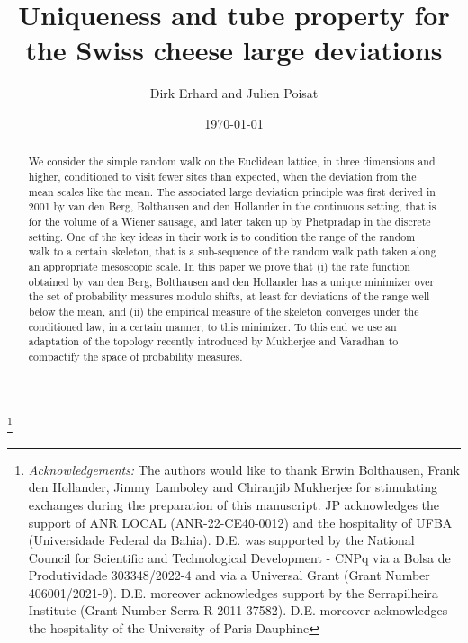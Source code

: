 \documentclass[a4paper,11pt]{amsart}
\numberwithin{equation}{section}
\newcommand{\8}{\infty}
\begin{document}
\title[]{Uniqueness and tube property for the Swiss cheese large deviations}
\author{Dirk Erhard and Julien Poisat}

\begin{abstract}
We consider the simple random walk on the Euclidean lattice, in three dimensions and higher, conditioned to visit fewer sites than expected, when the deviation from the mean scales like the mean. The associated large deviation principle was first derived in 2001 by van den Berg, Bolthausen and den Hollander in the continuous setting, that is for the volume of a Wiener sausage, and later taken up by Phetpradap in the discrete setting. One of the key ideas in their work is to condition the range of the random walk to a certain skeleton, that is a sub-sequence of the random walk path taken along an appropriate mesoscopic scale. In this paper we prove that (i) the rate function obtained by van den Berg, Bolthausen and den Hollander has a unique minimizer over the set of probability measures modulo shifts, at least for deviations of the range well below the mean, and (ii) the empirical measure of the skeleton converges under the conditioned law, in a certain manner, to this minimizer. To this end we use an adaptation of the topology recently introduced by Mukherjee and Varadhan to compactify the space of probability measures.
\end{abstract}

\thanks{{\it Acknowledgements:} The authors would like to thank Erwin Bolthausen, Frank den Hollander, Jimmy Lamboley and Chiranjib Mukherjee for stimulating exchanges during the preparation of this manuscript. JP acknowledges the support of ANR LOCAL (ANR-22-CE40-0012) and the hospitality of UFBA (Universidade Federal da Bahia). D.E. was supported by the National Council for Scientific and Technological Development - CNPq via a Bolsa de Produtividade 303348/2022-4 and via a Universal Grant (Grant Number 406001/2021-9). D.E.	moreover acknowledges support by the Serrapilheira Institute (Grant Number Serra-R-2011-37582). D.E. moreover acknowledges the hospitality of the University of Paris Dauphine}
%
 
 
\date{\today}

\maketitle
\end{document}
